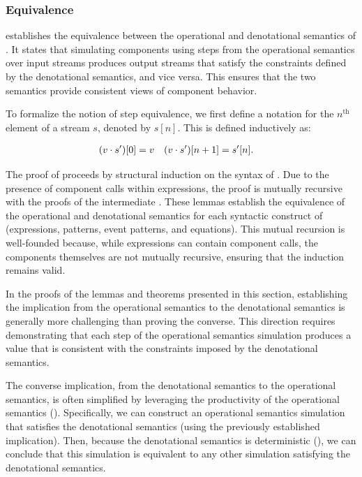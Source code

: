 \subsubsection{Equivalence}
\label{sec:semantics:grsync:theorems:equivalence}

 establishes the equivalence between the operational
and denotational semantics of \GRSync. It states that simulating components using steps from the
operational semantics over input streams produces output streams that satisfy the constraints
defined by the denotational semantics, and vice versa. This ensures that the two semantics provide
consistent views of component behavior.

To formalize the notion of step equivalence, we first define a notation for the $n^\text{th}$
element of a stream $s$, denoted by $s[n]$. This is defined inductively as:

\begin{align}
    (v \cdot s')[0] & = v & (v \cdot s')[n+1] & = s'[n]. \label{eq:semantics:grsync:theorems:equivalence:get}
\end{align}

The proof of  proceeds by structural induction on
the syntax of \GRSync. Due to the presence of component calls within expressions, the proof is
mutually recursive with the proofs of the intermediate
.
These lemmas establish the equivalence of the
operational and denotational semantics for each syntactic construct of \GRSync (expressions,
patterns, event patterns, and equations). This mutual recursion is well-founded because, while
expressions can contain component calls, the components themselves are not mutually recursive,
ensuring that the induction remains valid.

\begin{remark}
    \label{rmk:semantics:grsync:theorems:equivalence}
    In the proofs of the lemmas and theorems presented in this section, establishing the implication
    from the operational semantics to the denotational semantics is generally more challenging than
    proving the converse. This direction requires demonstrating that each step of the operational
    semantics simulation produces a value that is consistent with the constraints imposed by the
    denotational semantics.

    The converse implication, from the denotational semantics to the operational semantics, is often
    simplified by leveraging the productivity of the operational semantics
    (). Specifically, we can construct an
    operational semantics simulation that satisfies the denotational semantics (using the previously
    established implication). Then, because the denotational semantics is deterministic
    (), we can conclude that this simulation is
    equivalent to any other simulation satisfying the denotational semantics.
\end{remark}

